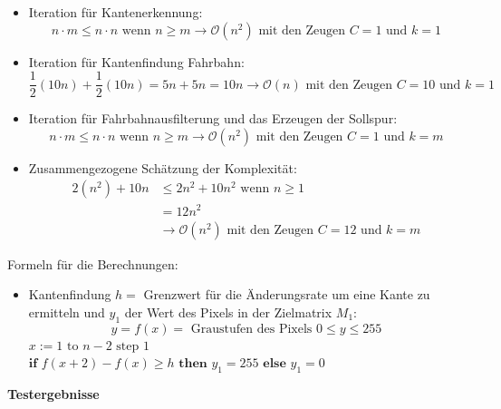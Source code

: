 \begin{itemize}
\item Iteration für Kantenerkennung:
\[
n \cdot m \leq n \cdot n \text{ wenn } n\geq m \rightarrow \mathcal{O}(n^2) \text{ mit den Zeugen }C=1 \text{ und } k = 1
\]
\item Iteration für Kantenfindung Fahrbahn:
\[
\frac{1}{2}(10n) + \frac{1}{2}(10n) = 5n + 5n = 10n \rightarrow \mathcal{O}(n) \text{ mit den Zeugen }C=10 \text{ und } k = 1
\]
\item Iteration für Fahrbahnausfilterung und das Erzeugen der Sollspur:
\[
n \cdot m \leq n \cdot n \text{ wenn } n\geq m \rightarrow \mathcal{O}(n^2) \text{ mit den Zeugen }C=1 \text{ und } k = m
\]
\item Zusammengezogene Schätzung der Komplexität:
\begin{align*}
2(n^2) + 10n &\leq 2n^2 + 10n^2 \text{ wenn } n\geq 1\\
             &= 12n^2\\
             &\rightarrow \mathcal{O}(n^2) \text{ mit den Zeugen }C=12 \text{ und } k = m
\end{align*}
\end{itemize}
Formeln für die Berechnungen:
\begin{itemize}
\item Kantenfindung $h=$ Grenzwert für die Änderungsrate um eine Kante zu ermitteln und $y_1$ der Wert des Pixels in der Zielmatrix $M_1$:
\[
y = f(x) = \text{ Graustufen des Pixels }0 \leq y \leq 255
\]
$x:=1 \text{ to } n-2 \text{ step } 1$\\ 
$\textbf{if } f(x+2)-f(x) \geq h \textbf{ then } y_1 = 255 \textbf{ else } y_1 = 0$\\
\end{itemize}
\textbf{Testergebnisse}\\